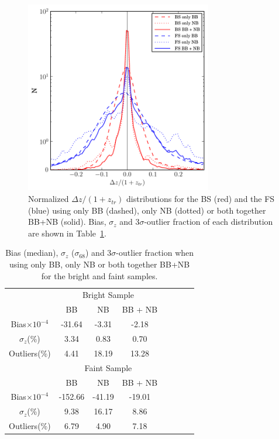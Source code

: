 \begin{figure}
\centering
\includegraphics[height=84mm]{./plots/Dz_pau_only_BB.pdf}
\caption{Normalized $\Delta z/(1+z_{tr})$ distributions for the BS (red) and the FS (blue) using only BB (dashed), only NB (dotted) or both together BB+NB (solid). Bias, $\sigma_z$ and 3$\sigma$-outlier fraction of each distribution are shown in Table~\ref{tab:usefulness_NB}.}
\label{Dz_pau_only_BB}
\end{figure}

\begin{table}
\centering
\begin{tabular}{cccccccc}
\cline{2-4}
 & \multicolumn{3}{c}{Bright Sample} \\
\cline{2-4}
 & BB & NB & BB + NB \\
\cline{1-4}
\multicolumn{1}{c}{Bias$\times10^{-4}$} & -31.64 & -3.31 & -2.18 \\
\multicolumn{1}{c}{$\sigma_z$(\%)} & 3.34 & 0.83 & 0.70 \\
\multicolumn{1}{c}{Outliers(\%)} & 4.41 & 18.19 & 13.28 \\
\cline{1-4}
 & \multicolumn{3}{c}{Faint Sample} \\
\cline{2-4}
 & BB & NB & BB + NB \\
\cline{1-4}
\multicolumn{1}{c}{Bias$\times10^{-4}$} & -152.66 & -41.19 & -19.01 \\
\multicolumn{1}{c}{$\sigma_z$(\%)} & 9.38 & 16.17 & 8.86 \\
\multicolumn{1}{c}{Outliers(\%)} & 6.79 & 4.90 & 7.18 \\
\cline{1-4}
\end{tabular}
\caption{Bias (median), $\sigma_z$ ($\sigma_{68}$) and $3\sigma$-outlier fraction when using only BB, only NB or both together BB+NB for the bright and faint samples.}
\label{tab:usefulness_NB}
\end{table}


